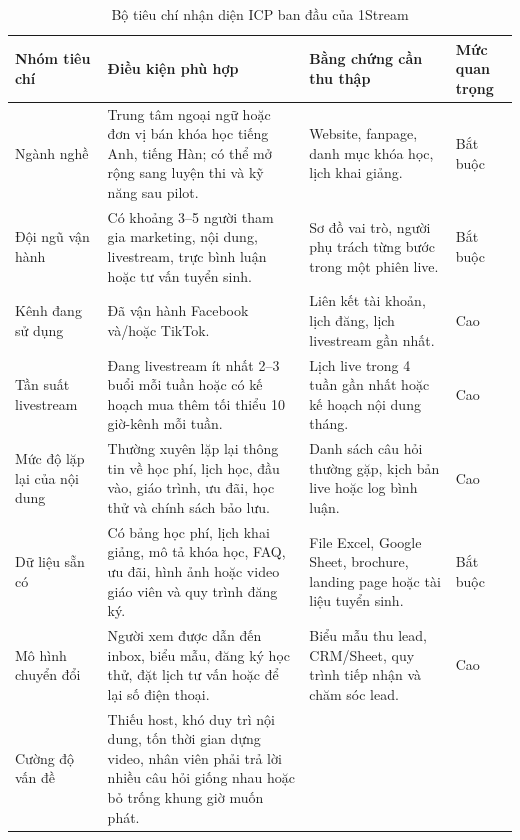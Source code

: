 \begin{table}[H]
    \centering
    \footnotesize
    \setlength{\tabcolsep}{3.5pt}
    \renewcommand{\arraystretch}{1.22}
    \caption{Bộ tiêu chí nhận diện ICP ban đầu của 1Stream}
    \label{tab:icp-criteria-1stream}
    \begin{tabularx}{\linewidth}{@{}L{2.3cm}Y Y L{2.1cm}@{}}
        \toprule
        \textbf{Nhóm tiêu chí} & \textbf{Điều kiện phù hợp} &
        \textbf{Bằng chứng cần thu thập} & \textbf{Mức quan trọng} \\ \midrule
        Ngành nghề & Trung tâm ngoại ngữ hoặc đơn vị bán khóa học tiếng Anh,
        tiếng Hàn; có thể mở rộng sang luyện thi và kỹ năng sau pilot. &
        Website, fanpage, danh mục khóa học, lịch khai giảng. & Bắt buộc \\
        Đội ngũ vận hành & Có khoảng 3--5 người tham gia marketing, nội dung,
        livestream, trực bình luận hoặc tư vấn tuyển sinh. &
        Sơ đồ vai trò, người phụ trách từng bước trong một phiên live. & Bắt buộc \\
        Kênh đang sử dụng & Đã vận hành Facebook và/hoặc TikTok. &
        Liên kết tài khoản, lịch đăng, lịch livestream gần nhất. & Cao \\
        Tần suất livestream & Đang livestream ít nhất 2--3 buổi mỗi tuần hoặc có
        kế hoạch mua thêm tối thiểu 10 giờ-kênh mỗi tuần. &
        Lịch live trong 4 tuần gần nhất hoặc kế hoạch nội dung tháng. & Cao \\
        Mức độ lặp lại của nội dung & Thường xuyên lặp lại thông tin về học phí,
        lịch học, đầu vào, giáo trình, ưu đãi, học thử và chính sách bảo lưu. &
        Danh sách câu hỏi thường gặp, kịch bản live hoặc log bình luận. & Cao \\
        Dữ liệu sẵn có & Có bảng học phí, lịch khai giảng, mô tả khóa học, FAQ,
        ưu đãi, hình ảnh hoặc video giáo viên và quy trình đăng ký. &
        File Excel, Google Sheet, brochure, landing page hoặc tài liệu tuyển sinh. & Bắt buộc \\
        Mô hình chuyển đổi & Người xem được dẫn đến inbox, biểu mẫu, đăng ký học
        thử, đặt lịch tư vấn hoặc để lại số điện thoại. &
        Biểu mẫu thu lead, CRM/Sheet, quy trình tiếp nhận và chăm sóc lead. & Cao \\
        Cường độ vấn đề & Thiếu host, khó duy trì nội dung, tốn thời gian dựng
        video, nhân viên phải trả lời nhiều câu hỏi giống nhau hoặc bỏ trống khung
        giờ muốn phát. &

\end{tabularx}
\end{table}
